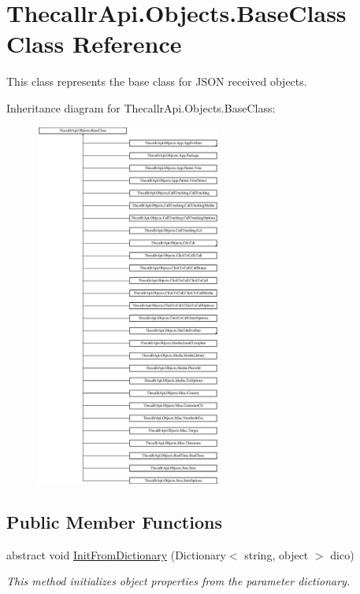 \hypertarget{class_thecallr_api_1_1_objects_1_1_base_class}{\section{Thecallr\+Api.\+Objects.\+Base\+Class Class Reference}
\label{class_thecallr_api_1_1_objects_1_1_base_class}
}


This class represents the base class for J\+S\+O\+N received objects.  


Inheritance diagram for Thecallr\+Api.\+Objects.\+Base\+Class\+:\begin{figure}[H]
\begin{center}
\leavevmode
\includegraphics[height=12.000000cm]{class_thecallr_api_1_1_objects_1_1_base_class}
\end{center}
\end{figure}
\subsection*{Public Member Functions}
\begin{DoxyCompactItemize}
\item 
abstract void \hyperlink{class_thecallr_api_1_1_objects_1_1_base_class_a77680f2cb89665fe65039581c7d907d2}{Init\+From\+Dictionary} (Dictionary$<$ string, object $>$ dico)
\begin{DoxyCompactList}\small\item\em This method initializes object properties from the parameter dictionary. \end{DoxyCompactList}\end{DoxyCompactItemize}


